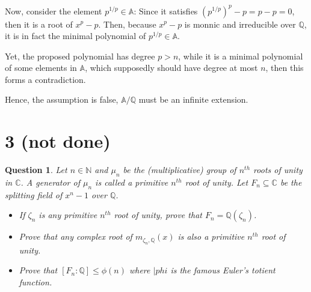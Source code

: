 \documentclass{article}
\newtheorem{question}{Question}
\begin{document}
Now, consider the element $p^{1/p}\in\mathbb{A}$: Since it satisfies $(p^{1/p})^p-p = p-p=0$, then it is a root of $x^p-p$.
Then, because $x^p-p$ is monnic and irreducible over $\mathbb{Q}$, it is in fact the minimal polynomial of $p^{1/p}\in\mathbb{A}$.

Yet, the proposed polynomial has degree $p>n$, while it is a minimal polynomial of some elements in $\mathbb{A}$, which supposedly should have degree at most $n$,
then this forms a contradiction.

Hence, the assumption is false, $\mathbb{A}/\mathbb{Q}$ must be an infinite extension.

\break

\section*{3 (not done)}
\begin{myBox}[]{}
    \begin{question}
        Let $n\in\mathbb{N}$ and $\mu_n$ be the (multiplicative) group of $n^{th}$ roots of unity in $\mathbb{C}$.
        A generator of $\mu_n$ is called a primitive $n^{th}$ root of unity. Let $F_n\subseteq\mathbb{C}$ be the splitting field  of $x^n-1$ over $\mathbb{Q}$.
        \begin{itemize}
            \item[(a)] If $\zeta_n$ is any primitive $n^{th}$ root of unity, prove that $F_n=\mathbb{Q}(\zeta_n)$.
            \item[(b)] Prove that any complex root of $m_{\zeta_n,\mathbb{Q}}(x)$ is also a primitive $n^{th}$ root of unity.
            \item[(c)] Prove that $[F_n:\mathbb{Q}]\leq \phi(n)$ where $|phi$ is the famous Euler's totient function.
        \end{itemize}
    \end{question}
\end{myBox}
\end{document}
